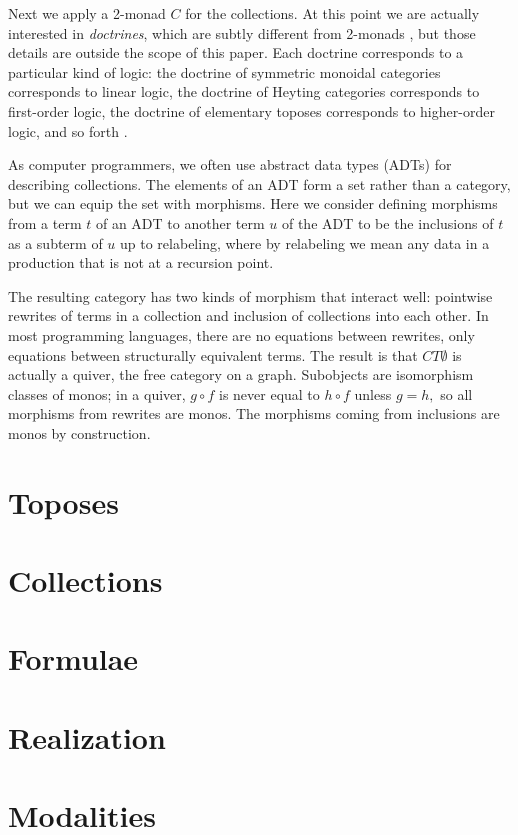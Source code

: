 \documentclass[sigplan,9pt,review,anonymous]{acmart}\settopmatter{printfolios=true,printccs=false,printacmref=false}
\begin{document}
Next we apply a 2-monad $C$ for the collections.  At this point we are actually interested in {\em doctrines}, which are subtly different from 2-monads \cite{nlabDoctrine}, but those details are outside the scope of this paper.  Each doctrine corresponds to a particular kind of logic: the doctrine of symmetric monoidal categories corresponds to linear logic, the doctrine of Heyting categories corresponds to first-order logic, the doctrine of elementary toposes corresponds to higher-order logic, and so forth \cite{nlabInternalLogicKindsOfInternalLogic}.

As computer programmers, we often use abstract data types (ADTs) for describing collections.  The elements of an ADT form a set rather than a category, but we can equip the set with morphisms.  Here we consider defining morphisms from a term $t$ of an ADT to another term $u$ of the ADT to be the inclusions of $t$ as a subterm of $u$ up to relabeling, where by relabeling we mean any data in a production that is not at a recursion point.

The resulting category has two kinds of morphism that interact well: pointwise rewrites of terms in a collection and inclusion of collections into each other.  In most programming languages, there are no equations between rewrites, only equations between structurally equivalent terms.  The result is that $CT\emptyset$ is actually a quiver, the free category on a graph.  Subobjects are isomorphism classes of monos; in a quiver, $g\circ f$ is never equal to $h\circ f$ unless $g=h,$ so all morphisms from rewrites are monos.  The morphisms coming from inclusions are monos by construction.



\section{Toposes}
\section{Collections}
\section{Formulae}
\section{Realization}
\section{Modalities}
\end{document}
